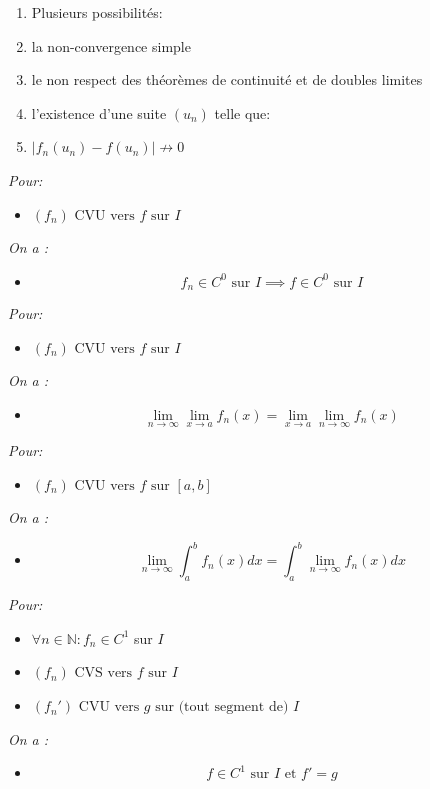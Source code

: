 \documentclass[a4paper,12pt]{report}
\newcommand{\Thm}[2]{\begin{tcolorbox}[colback=white,colframe=Red!60, title=Théorème : #1]#2\end{tcolorbox}}
\newcommand{\Methode}[2]{\begin{tcolorbox}[colback=white, title=Méthode :  #1]#2\end{tcolorbox}}
\def\N{\mathbb{N}}
\begin{document}
\Methode{Etablir la non-convergence uniforme}{
\begin{enumerate}
    \item[] Plusieurs possibilités: 
    \item la non-convergence simple
    \item le non respect des théorèmes de continuité et de doubles limites
    \item l'existence d'une suite $(u_n)$ telle que:
    \item[] \(|f_n(u_n) - f(u_n)| \not\rightarrow 0\)
\end{enumerate}
}

\Thm{Continuité de la limite uniforme}{
\textit{Pour:}
\begin{itemize}
  \item[] \((f_n) \text{ CVU vers $f$ sur $I$} \)
\end{itemize}
\textit{On a :}
\begin{itemize}
    \item[] \[f_n \in C^0 \text{ sur }  I\implies f\in C^0 \text{ sur }  I\]
\end{itemize}
}

\Thm{Théorème de la double limite}{
\textit{Pour:}
\begin{itemize}
  \item[] \((f_n) \text{ CVU vers $f$ sur $I$} \)
\end{itemize}
\textit{On a :}
\begin{itemize}
    \item[] \[\lim_{n\to\infty} \lim_{x\to a} f_n(x) = \lim_{x\to a} \lim_{n\to\infty} f_n(x) \]
\end{itemize}
}

\Thm{Échange intégrale et limite entière \underline{sur un segment}}{
\textit{Pour:}
\begin{itemize}
  \item[] \((f_n) \text{ CVU vers $f$ sur $[a,b]$} \)
\end{itemize}
\textit{On a :}
\begin{itemize}
    \item[] \[\lim_{n\to\infty} \int_a^b f_n(x)dx = \int_a^b \lim_{n\to\infty} f_n(x)dx \]
\end{itemize}
}

\Thm{De la classe $C^1$}{
\textit{Pour:}
\begin{itemize}
    \item[] \(\forall n \in \N : f_n \in C^1 \) sur $I$
    \item[] \((f_n) \text{ CVS vers $f$ sur $I$} \)
    \item[] \((f_n') \text{ CVU vers $g$ sur (tout segment de) $I$} \)
\end{itemize}
\textit{On a :}
\begin{itemize}
    \item[] \[f\in C^1 \text{ sur } I \text{ et } f'=g\]
\end{itemize}
}
\end{document}
